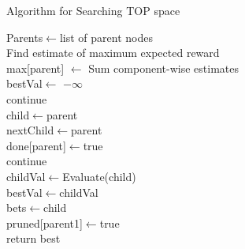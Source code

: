 \documentclass{IEEEtran}
\begin{document}
\begin{algorithm}
\caption{Algorithm for Searching TOP space}
\label{figureAlgoritmo}
    \begin{algorithmic}
    \State Parents$\gets$list of parent nodes
        \\
        \quad\quad Find estimate of maximum expected reward\\
        \quad\quad max[parent] $\gets$ Sum component-wise estimates
        \EndFor\\
    bestVal$\gets$ $-\infty$
    \EndFor
        \\
        \quad\quad continue\\
        \quad child$\gets$parent\\
        \quad nextChild\(\)$\gets$parent 
        \\
        \quad\quad done[parent]$\gets$true\\
        \quad\quad continue\\
        \quad childVal$\gets$Evaluate(child)
        \\
        \quad\quad bestVal$\gets$childVal\\
        \quad\quad bets$\gets$child
        \quad\quad {}\\
        \quad\quad\quad\quad\quad pruned[parent1]$\gets$true
        \quad\quad \EndIf
        \quad \EndFor
        \EndIf\\
    return best    
    \EndFor
    \end{algorithmic} 
\end{algorithm}
\end{document}
